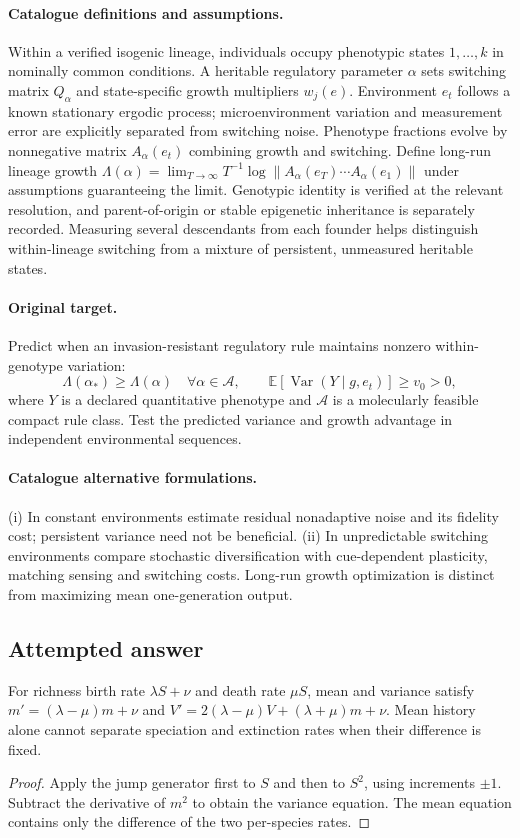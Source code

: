 \documentclass[11pt]{article}
\begin{document}
\paragraph{Catalogue definitions and assumptions.}
Within a verified isogenic lineage, individuals occupy phenotypic states $1,\ldots,k$ in nominally common conditions. A heritable regulatory parameter $\alpha$ sets switching matrix $Q_\alpha$ and state-specific growth multipliers $w_j(e)$. Environment $e_t$ follows a known stationary ergodic process; microenvironment variation and measurement error are explicitly separated from switching noise. Phenotype fractions evolve by nonnegative matrix $A_\alpha(e_t)$ combining growth and switching. Define long-run lineage growth $\Lambda(\alpha)=\lim_{T\to\infty}T^{-1}\log\|A_\alpha(e_T)\cdots A_\alpha(e_1)\|$ under assumptions guaranteeing the limit. Genotypic identity is verified at the relevant resolution, and parent-of-origin or stable epigenetic inheritance is separately recorded. Measuring several descendants from each founder helps distinguish within-lineage switching from a mixture of persistent, unmeasured heritable states.
\paragraph{Original target.}
Predict when an invasion-resistant regulatory rule maintains nonzero within-genotype variation:
\[
 \Lambda(\alpha_*)\ge\Lambda(\alpha)\quad\forall\alpha\in\mathcal A,
 \qquad \mathbb{E}[\operatorname{Var}(Y\mid g,e_t)]\ge v_0>0,
\]
where $Y$ is a declared quantitative phenotype and $\mathcal A$ is a molecularly feasible compact rule class. Test the predicted variance and growth advantage in independent environmental sequences.
\paragraph{Catalogue alternative formulations.}
(i) In constant environments estimate residual nonadaptive noise and its fidelity cost; persistent variance need not be beneficial. (ii) In unpredictable switching environments compare stochastic diversification with cue-dependent plasticity, matching sensing and switching costs. Long-run growth optimization is distinct from maximizing mean one-generation output.
\subsection{Attempted answer}
\begin{proposition}
For richness birth rate $\lambda S+\nu$ and death rate $\mu S$, mean and variance satisfy $m\prime=(\lambda-\mu)m+\nu$ and $V\prime=2(\lambda-\mu)V+(\lambda+\mu)m+\nu$. Mean history alone cannot separate speciation and extinction rates when their difference is fixed.
\end{proposition}
\begin{proof}
Apply the jump generator first to $S$ and then to $S^2$, using increments $\pm1$. Subtract the derivative of $m^2$ to obtain the variance equation. The mean equation contains only the difference of the two per-species rates.
\end{proof}
\end{document}
